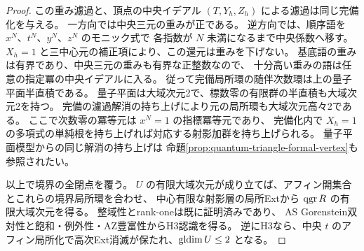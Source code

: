 \begin{proof}
この重み濾過と、頂点の中央イデアル $(T,Y_h,Z_h)$ による濾過は同じ完備化を与える。
一方向では中央三元の重みが正である。
逆方向では、順序語を $x^N$、$t^N$、$y^N$、$z^N$ のモニック式で
各指数が $N$ 未満になるまで中央係数へ移す。
$X_h=1$ と三中心元の補正項により、この還元は重みを下げない。
基底語の重みは有界であり、中央三元の重みも有界な正整数なので、
十分高い重みの語は任意の指定冪の中央イデアルに入る。
従って完備局所環の随伴次数環は上の量子平面半直積である。
量子平面は大域次元2で、標数零の有限群の半直積も大域次元2を持つ。
完備の濾過解消の持ち上げにより元の局所環も大域次元高々2である。
ここで次数零の冪等元は $x^N=1$ の指標冪等元であり、
完備化内で $X_h=1$ の多項式の単純根を持ち上げれば対応する射影加群を持ち上げられる。
量子平面模型からの同じ解消の持ち上げは
命題\ref{prop:quantum-triangle-formal-vertex}も参照されたい。

以上で境界の全閉点を覆う。
$U$ の有限大域次元が成り立てば、アフィン開集合とこれらの境界局所環を合わせ、
中心有限な射影層の局所Extから $\operatorname{qgr} R$ の有限大域次元を得る。
整域性とrank-oneは既に証明済みであり、
AS Gorenstein双対性と飽和・例外性・AZ豊富性からH3認識を得る。
逆にH3なら、中央 $t$ のアフィン局所化で高次Ext消滅が保たれ、$\operatorname{gldim} U\le2$ となる。
\end{proof}

